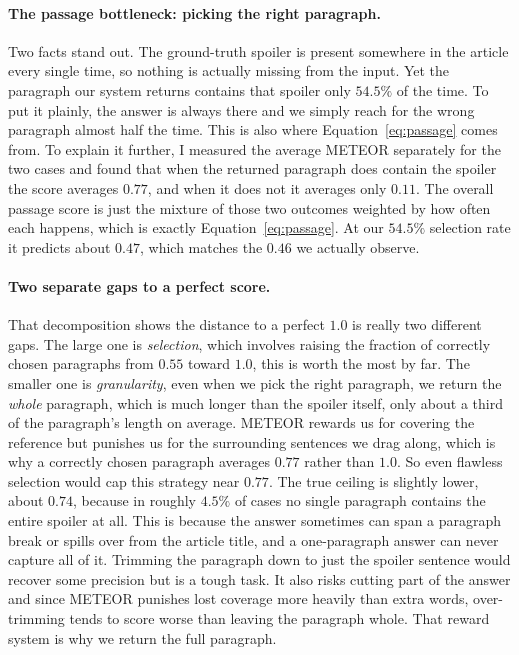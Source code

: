 \documentclass[11pt]{article}
\begin{document}
\paragraph{The passage bottleneck: picking the right paragraph.}
Two facts stand out. The ground-truth spoiler is present somewhere in the article
every single time, so nothing is actually missing from the input. Yet the
paragraph our system returns contains that spoiler only $54.5\%$ of the time. To put it
plainly, the answer is always there and we simply reach for the wrong paragraph
almost half the time. This is also where Equation~\ref{eq:passage} comes from. To explain it further, I measured the average METEOR separately for the two
cases and found that when the returned paragraph does contain the spoiler the
score averages $0.77$, and when it does not it averages only $0.11$. The overall
passage score is just the mixture of those two outcomes weighted by how often each
happens, which is exactly Equation~\ref{eq:passage}. At our $54.5\%$ selection
rate it predicts about $0.47$, which matches the $0.46$ we actually observe.

\paragraph{Two separate gaps to a perfect score.}
That decomposition shows the distance to a perfect $1.0$ is really two different
gaps. The large one is \textit{selection}, which involves raising the fraction of correctly
chosen paragraphs from $0.55$ toward $1.0$, this is worth the most by far. The smaller
one is \textit{granularity}, even when we pick the right paragraph, we return the
\textit{whole} paragraph, which is much longer than the spoiler itself, only about
a third of the paragraph's length on average. METEOR rewards us for covering the
reference but punishes us for the surrounding sentences we drag along, which is why a
correctly chosen paragraph averages $0.77$ rather than $1.0$. So even flawless
selection would cap this strategy near $0.77$. The true ceiling is slightly lower,
about $0.74$, because in roughly $4.5\%$ of cases no single paragraph contains the
entire spoiler at all. This is because the answer sometimes can span a paragraph break or spills over from
the article title, and a one-paragraph answer can never capture all of it.
Trimming the paragraph down to just the spoiler sentence would recover some
precision but is a tough task. It also risks cutting part of the answer and since METEOR punishes lost
coverage more heavily than extra words, over-trimming tends to score worse
than leaving the paragraph whole. That reward system is why we return the full paragraph.
\end{document}
